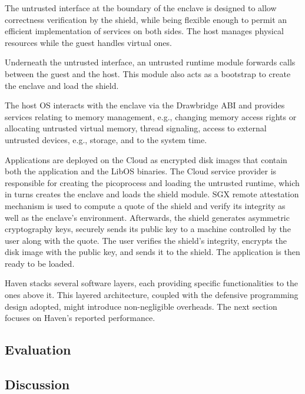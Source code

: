 The untrusted interface at the boundary of the enclave is designed to allow correctness verification by the shield, while being flexible enough to permit an efficient implementation of services on both sides.
The host manages physical resources while the guest handles virtual ones.

Underneath the untrusted interface, an untrusted runtime module forwards calls between the guest and the host.
This module also acts as a bootstrap to create the enclave and load the shield.

The host OS interacts with the enclave via the Drawbridge ABI and provides services relating to memory management, e.g., changing memory access rights or allocating untrusted virtual memory, thread signaling, access to external untrusted devices, e.g., storage, and to the system time.

Applications are deployed on the Cloud as encrypted disk images that contain both the application and the LibOS binaries.
The Cloud service provider is responsible for creating the picoprocess and loading the untrusted runtime, which in turns creates the enclave and loads the shield module.
SGX remote attestation mechanism is used to compute a quote of the shield and verify its integrity as well as the enclave's environment.
Afterwards, the shield generates asymmetric cryptography keys, securely sends its public key to a machine controlled by the user along with the quote.
The user verifies the shield's integrity, encrypts the disk image with the public key, and sends it to the shield.
The application is then ready to be loaded.

Haven stacks several software layers, each providing specific functionalities to the ones above it.
This layered architecture, coupled with the defensive programming design adopted, might introduce non-negligible overheads.
The next section focuses on Haven's reported performance.


\subsection{Evaluation}



\subsection{Discussion}







